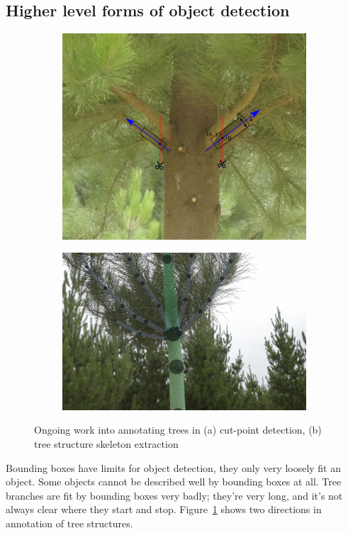 \subsection{Higher level forms of object detection}

\begin{figure}[h!]
\begin{subfigure}[t]{1.0\linewidth}
  \centering
  \includegraphics[width=0.8\linewidth]{figures/future/tree_cutpoint.pdf}
  \caption{} 
\end{subfigure}

\begin{subfigure}[t]{1.0\linewidth}
  \centering
  \includegraphics[width=0.8\linewidth]{figures/future/tree_branches.jpg}
  \caption{} 
\end{subfigure}
\caption{Ongoing work into annotating trees in (a) cut-point detection, (b) tree structure skeleton extraction }
\label {fig:future_trees}
\end{figure}

Bounding boxes have limits for object detection, they only very loosely fit an object. Some objects cannot be described well by bounding boxes at all. Tree branches are fit by bounding boxes very badly; they're very long, and it's not always clear where they start and stop. Figure~\ref{fig:future_trees} shows two directions in annotation of tree structures. 


